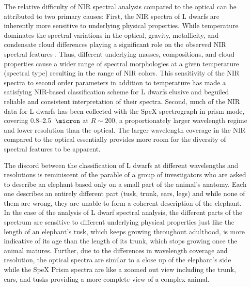 \documentclass[12pt,preprint]{aastex}
\begin{document}
The relative difficulty of NIR spectral analysis compared to the optical can be attributed to two primary causes:
First, the NIR spectra of L dwarfs are inherently more sensitive to underlying physical properties.
While temperature dominates the spectral variations in the optical, gravity, metallicity, and condensate cloud differences playing a significant role on the observed NIR spectral features \citep{Knapp04}.
Thus, different underlying masses, compositions, and cloud properties cause a wider range of spectral morphologies at a given temperature (spectral type) resulting in the range of NIR colors.
This sensitivity of the NIR spectra to second order parameters in addition to temperature has made a satisfying NIR-based classification scheme for L dwarfs elusive and beguiled reliable and consistent interpretation of their spectra.
Second, much of the NIR data for L dwarfs has been collected with the SpeX spectrograph in prism mode, covering 0.8--2.5~$\micron$ at $R\sim200$, a proportionately larger wavelength regime and lower resolution than the optical.
The larger wavelength coverage in the NIR compared to the optical essentially provides more room for the diversity of spectral features to be apparent.

The discord between the classification of L dwarfs at different wavelengths and resolutions is reminiscent of the parable of a group of investigators who are asked to describe an elephant based only on a small part of the animal's anatomy. 
Each one describes an entirely different part (tusk, trunk, ears, legs) and while none of them are wrong, they are unable to form a coherent description of the elephant.
In the case of the analysis of L dwarf spectral analysis, the different parts of the spectrum are sensitive to different underlying physical properties just like the length of an elephant's tusk, which keeps growing throughout adulthood, is more indicative of its age than the length of its trunk, which stops growing once the animal matures. 
Further, due to the differences in wavelength coverage and resolution, the optical spectra are similar to a close up of the elephant's side while the SpeX Prism spectra are like a zoomed out view including the trunk, ears, and tusks providing a more complete view of a complex animal.
\end{document}
